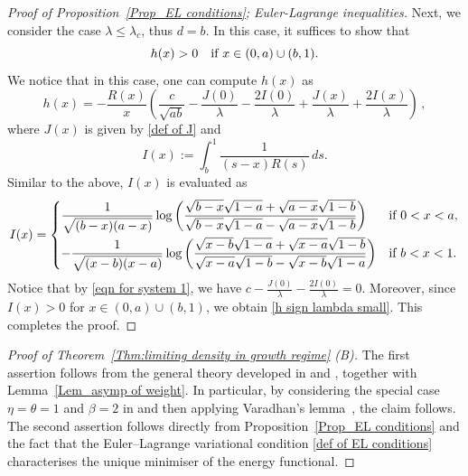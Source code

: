 \documentclass{amsart}
\theoremstyle{plain}
\theoremstyle{remark}
\numberwithin{equation}{section}
\begin{document}
\begin{proof}[Proof of Proposition~\ref{Prop_EL conditions}; Euler-Lagrange inequalities]
Next, we consider the case $\lambda \le \lambda_c$, thus $d=b$. In this case, it suffices to show that  
\begin{equation} \label{h sign lambda small}
h(x)>0 \quad \textup{if } x \in (0,a)\cup (b,1). 
\end{equation} 
We notice that in this case, one can compute $h(x)$ as 
\begin{equation}
    h(x) = -\frac{R(x)}{x }\left(\frac{c}{ \sqrt{ab} }-\frac{J(0)}{\lambda} - \frac{2I(0)}{\lambda} + \frac{J(x)}{\lambda} + \frac{2I(x)}{\lambda}\right)\,,
    \end{equation}
where $J(x)$ is given by \eqref{def of J} and  
\begin{equation}
I(x):= \int_b^1 \frac{1}{(s-x)R(s)} \, ds. 
\end{equation}
Similar to the above, $I(x)$ is evaluated as 
\begin{equation}  \label{integral eval of I}
 I(x) =  \begin{cases}
   \displaystyle     \frac{1}{\sqrt{(b-x)(a-x)}}\log\bigg(\frac{\sqrt{b-x}\sqrt{1-a} + \sqrt{a-x}\sqrt{1-b} }{\sqrt{b-x}\sqrt{1-a} - \sqrt{a-x}\sqrt{1-b}}\bigg)  & \textup{if } 0<x<a, 
        \smallskip 
        \\
     \displaystyle      -\frac{1}{\sqrt{(x-b)(x-a)}}\log\bigg(\frac{\sqrt{x-b}\sqrt{1-a} + \sqrt{x-a}\sqrt{1-b} }{ \sqrt{x-a}\sqrt{1-b} - \sqrt{x-b}\sqrt{1-a}}\bigg) & \textup{if } b<x<1. 
    \end{cases}
\end{equation} 
Notice that by \eqref{eqn for system 1}, we have $c-\frac{J(0)}{\lambda} - \frac{2I(0)}{\lambda}=0$. Moreover, since $I(x)>0$ for $x \in (0,a) \cup (b,1)$, we obtain \eqref{h sign lambda small}. This completes the proof. 
\end{proof}
 



\begin{proof}[Proof of Theorem~\ref{Thm:limiting density in growth regime} (B)] The first assertion follows from the general theory developed in \cite[Theorem~1.1]{HMO25} and \cite[Theorem~1.7]{DD22}, together with Lemma~\ref{Lem_asymp of weight}. In particular, by considering the special case $\eta=\theta=1$ and $\beta=2$ in \cite[Theorem~1.1]{HMO25} and then applying Varadhan’s lemma~\cite{LDP_book}, the claim follows.
The second assertion follows directly from Proposition~\ref{Prop_EL conditions} and the fact that the Euler--Lagrange variational condition \eqref{def of EL conditions} characterises the unique minimiser of the energy functional.
\end{proof}
\end{document}
